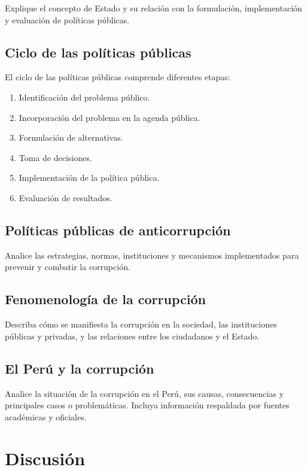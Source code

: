 \documentclass[12pt,a4paper]{article}
\begin{document}
Explique el concepto de Estado y su relación con la formulación, implementación y evaluación de políticas públicas.

\subsection{Ciclo de las políticas públicas}

El ciclo de las políticas públicas comprende diferentes etapas:

\begin{enumerate}
    \item Identificación del problema público.
    \item Incorporación del problema en la agenda pública.
    \item Formulación de alternativas.
    \item Toma de decisiones.
    \item Implementación de la política pública.
    \item Evaluación de resultados.
\end{enumerate}

\subsection{Políticas públicas de anticorrupción}

Analice las estrategias, normas, instituciones y mecanismos implementados para prevenir y combatir la corrupción.

\subsection{Fenomenología de la corrupción}

Describa cómo se manifiesta la corrupción en la sociedad, las instituciones públicas y privadas, y las relaciones entre los ciudadanos y el Estado.

\subsection{El Perú y la corrupción}

Analice la situación de la corrupción en el Perú, sus causas, consecuencias y principales casos o problemáticas. Incluya información respaldada por fuentes académicas y oficiales.

\section{Discusión}
\end{document}
